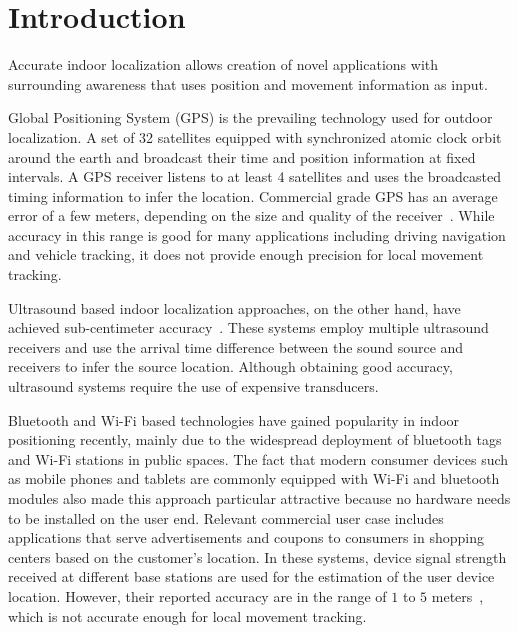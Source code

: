 \chapter{Introduction}

Accurate indoor localization allows creation of novel applications with surrounding awareness that uses position and movement information as input. 

Global Positioning System (GPS) is the prevailing technology used for outdoor localization. A set of 32 satellites equipped with synchronized atomic clock orbit around the earth and broadcast their time and position information at fixed intervals. A GPS receiver listens to at least 4 satellites and uses the broadcasted timing information to infer the location. Commercial grade GPS has an average error of a few meters, depending on the size and quality of the receiver~\cite{intro:gps}. While accuracy in this range is good for many applications including driving navigation and vehicle tracking, it does not provide enough precision for local movement tracking. 

Ultrasound based indoor localization approaches, on the other hand, have achieved sub-centimeter accuracy~\cite{intro:ultra}. These systems employ multiple ultrasound receivers and use the arrival time difference between the sound source and receivers to infer the source location. Although obtaining good accuracy, ultrasound systems require the use of expensive transducers.

Bluetooth and Wi-Fi based technologies have gained popularity in indoor positioning recently, mainly due to the widespread deployment of bluetooth tags and Wi-Fi stations in public spaces. The fact that modern consumer devices such as mobile phones and tablets are commonly equipped with Wi-Fi and bluetooth modules also made this approach particular attractive because no hardware needs to be installed on the user end. Relevant commercial user case includes applications that serve advertisements and coupons to consumers in shopping centers based on the customer's location. In these systems, device signal strength received at different base stations are used for the estimation of the user device location. However, their reported accuracy are in the range of $1$ to $5$ meters~\cite{intro:blue, intro:loc}, which is not accurate enough for local movement tracking.

